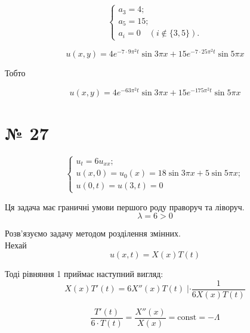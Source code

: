 \documentclass[11pt, a4paper]{article} %
\begin{document}
\begin{equation}
\begin{cases}
    a_3 = 4; \\
    a_5 = 15; \\
    a_i = 0 \quad (i\notin \{3,5\}).
\end{cases}
\end{equation}

$$u(x,y) = 4 e^{-7\cdot 9\pi^2 t} \sin 3\pi x + 15 e^{-7\cdot 25\pi^2 t} \sin 5\pi x$$

Тобто
\begin{mdframed}[style=ans]
    $$u(x,y) = 4 e^{-63\pi^2 t} \sin 3\pi x + 15 e^{-175\pi^2 t} \sin 5\pi x$$
\end{mdframed}

\section*{№ 27}

\begin{mdframed}
    \begin{equation}
        \begin{cases}
            u_t=6u_{xx};\\
            u(x,0) = u_0(x) = 18\sin 3\pi x + 5 \sin 5\pi x;\\
            u(0,t) = u(3,t) = 0
        \end{cases}    
    \end{equation}
\end{mdframed}

\begin{mdframed}[backgroundcolor=violet!25]
    Ця задача має граничні умови першого роду праворуч та ліворуч.
    $$\lambda = 6 > 0$$
\end{mdframed}

Розв'язуємо задачу методом розділення змінних.\\
Нехай
\begin{equation}
    u(x,t) = X(x)T(t)
\end{equation}

Тоді рівняння 1 приймає наступний вигляд:
\begin{equation}
    X(x) T'(t) = 6 X''(x) T(t) \; | \cdot \frac{1}{6 X(x)T(t)}
\end{equation}

\begin{equation}
    \frac{T'(t)}{6\cdot T(t)} = \frac{X''(x)}{X(x)} = \text{const} = -\Lambda
\end{equation}
\end{document}
